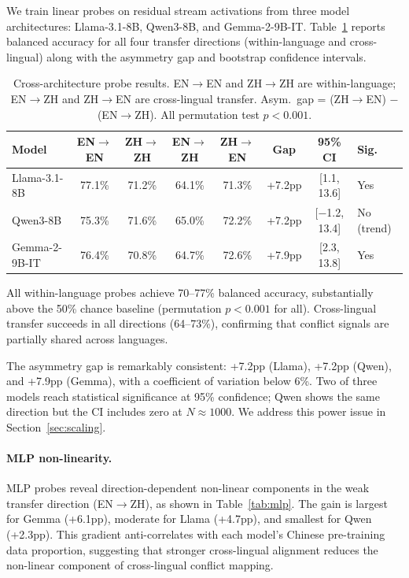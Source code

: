 \documentclass{article}
\begin{document}
We train linear probes on residual stream activations from three model architectures: Llama-3.1-8B, Qwen3-8B, and Gemma-2-9B-IT. Table~\ref{tab:cross_arch} reports balanced accuracy for all four transfer directions (within-language and cross-lingual) along with the asymmetry gap and bootstrap confidence intervals.

\begin{table}[t]
\centering
\caption{Cross-architecture probe results. EN$\to$EN and ZH$\to$ZH are within-language; EN$\to$ZH and ZH$\to$EN are cross-lingual transfer. Asym.\ gap = (ZH$\to$EN) $-$ (EN$\to$ZH). All permutation test $p < 0.001$.}
\label{tab:cross_arch}
\small
\begin{tabular}{lccccccl}
\toprule
Model & EN$\to$EN & ZH$\to$ZH & EN$\to$ZH & ZH$\to$EN & Gap & 95\% CI & Sig. \\
\midrule
Llama-3.1-8B & 77.1\% & 71.2\% & 64.1\% & 71.3\% & +7.2pp & [1.1, 13.6] & Yes \\
Qwen3-8B & 75.3\% & 71.6\% & 65.0\% & 72.2\% & +7.2pp & [$-$1.2, 13.4] & No (trend) \\
Gemma-2-9B-IT & 76.4\% & 70.8\% & 64.7\% & 72.6\% & +7.9pp & [2.3, 13.8] & Yes \\
\bottomrule
\end{tabular}
\end{table}

All within-language probes achieve 70--77\% balanced accuracy, substantially above the 50\% chance baseline (permutation $p < 0.001$ for all). Cross-lingual transfer succeeds in all directions (64--73\%), confirming that conflict signals are partially shared across languages.

The asymmetry gap is remarkably consistent: +7.2pp (Llama), +7.2pp (Qwen), and +7.9pp (Gemma), with a coefficient of variation below 6\%. Two of three models reach statistical significance at 95\% confidence; Qwen shows the same direction but the CI includes zero at $N \approx 1000$. We address this power issue in Section~\ref{sec:scaling}.

\paragraph{MLP non-linearity.}
MLP probes reveal direction-dependent non-linear components in the weak transfer direction (EN$\to$ZH), as shown in Table~\ref{tab:mlp}. The gain is largest for Gemma (+6.1pp), moderate for Llama (+4.7pp), and smallest for Qwen (+2.3pp). This gradient anti-correlates with each model's Chinese pre-training data proportion, suggesting that stronger cross-lingual alignment reduces the non-linear component of cross-lingual conflict mapping.
\end{document}
